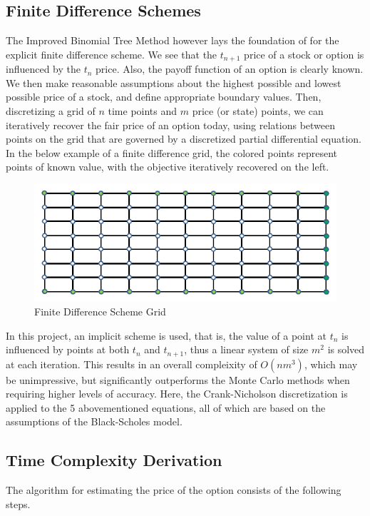 \documentclass{article}
\begin{document}
\subsection{Finite Difference Schemes}
The Improved Binomial Tree Method however lays the foundation of for the explicit finite difference scheme. We see that the \(t_{n+1}\) price of a stock or option is influenced by the \(t_n\) price. Also, the payoff function of an option is clearly known. We then make reasonable assumptions about the highest possible and lowest possible price of a stock, and define appropriate boundary values. Then, discretizing a grid of \(n\) time points and \(m\) price (or state) points, we can iteratively recover the fair price of an option today, using relations between points on the grid that are governed by a discretized partial differential equation. In the below example of a finite difference grid, the colored points represent points of known value, with the objective iteratively recovered on the left.

\begin{figure}[H]
  \includegraphics[width=\textwidth]{fds.png}
  \caption{Finite Difference Scheme Grid\cite{qf4102}}
  \label{figure:name}
\end{figure}

In this project, an implicit scheme is used, that is, the value of a point at \(t_n\) is influenced by points at both \(t_n\) and \(t_{n+1}\), thus a linear system of size \(m^2\) is solved at each iteration. This results in an overall compleixity of \(O(nm^3)\), which may be unimpressive, but significantly outperforms the Monte Carlo methods when requiring higher levels of accuracy. Here, the Crank-Nicholson discretization is applied to the 5 abovementioned equations, all of which are based on the assumptions of the Black-Scholes model.

\subsection{Time Complexity Derivation}
The algorithm for estimating the price of the option consists of the following steps.
\end{document}
